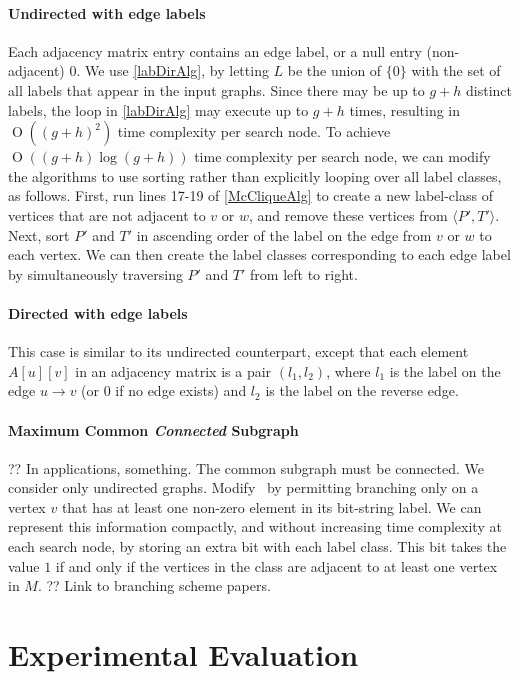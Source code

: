 \documentclass[letterpaper]{article}
\newcommand{\McSplit}{\textproc{McSplit}}
\newcommand{\BigO}[1]{\ensuremath{\operatorname{O}\left(#1\right)}}
\begin{document}
\paragraph{Undirected with edge labels} Each adjacency matrix entry contains an
edge label, or a null entry (non-adjacent) $0$.  We use \cref{labDirAlg}, by
letting $L$ be the union of $\{0\}$ with the set of all labels that appear in
the input graphs. Since there may be up to $g + h$ distinct labels, the loop in
\cref{labDirAlg} may execute up to $g + h$ times, resulting in $\BigO{(g+h)^2}$
time complexity per search node.  To achieve $\BigO{(g+h) \log (g+h)}$ time
complexity per search node, we can modify the algorithms to use sorting rather
than explicitly looping over all label classes, as follows.  First, run lines
17-19 of \cref{McCliqueAlg} to create a new label-class of vertices that are
not adjacent to $v$ or $w$, and remove these vertices from $\langle P',T'
\rangle$.  Next, sort $P'$ and $T'$ in ascending order of the label on the edge
from $v$ or $w$ to each vertex. We can then create the label classes
corresponding to each edge label by simultaneously traversing $P'$ and $T'$
from left to right.

\paragraph{Directed with edge labels} This case is similar to its undirected
counterpart, except that each element $A[u][v]$ in an adjacency matrix is a
pair $(l_1, l_2)$, where $l_1$ is the label on the edge $u \rightarrow v$ (or 0
if no edge exists) and $l_2$ is the label on the reverse edge.

\paragraph{Maximum Common \emph{Connected} Subgraph} ?? In applications,
something. The common subgraph must be connected. We consider only undirected
graphs.  Modify \McSplit\ by permitting branching only on a vertex $v$ that has
at least one non-zero element in its bit-string label.  We can represent this
information compactly, and without increasing time complexity at each search
node, by storing an extra bit with each label class.  This bit takes the value
$1$ if and only if the vertices in the class are adjacent to at least one
vertex in $M$. ?? Link to branching scheme papers.

\section{Experimental Evaluation}
\end{document}
